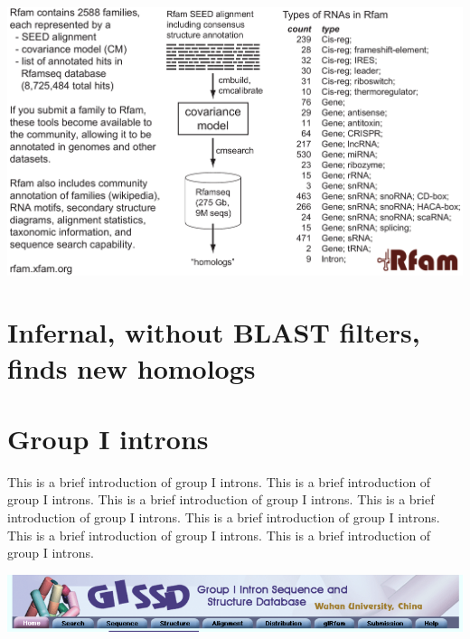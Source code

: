 \documentclass[custom,landscape,final,30pt,plainboxedsections]{sciposter-titleskipsmall}
\begin{document}
\begin{multicols}{3}
\begin{center}
\includegraphics[width=13.5in]{figs/rfam-poster}
\end{center}

\section*{Infernal, without BLAST filters, finds new homologs}


\columnbreak


\section*{Group I introns}

This is a brief introduction of group I introns.
This is a brief introduction of group I introns.
This is a brief introduction of group I introns.
This is a brief introduction of group I introns.
This is a brief introduction of group I introns.
This is a brief introduction of group I introns.
This is a brief introduction of group I introns.

\begin{center}
\includegraphics[width=13.5in]{figs/gissd-banner}


\end{center}
\end{multicols}
\end{document}
